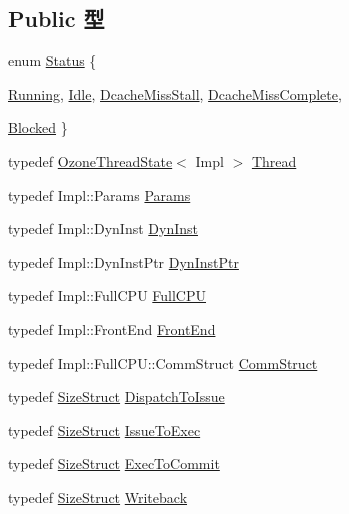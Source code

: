 \subsection*{Public 型}
\begin{DoxyCompactItemize}
\item 
enum \hyperlink{classBackEnd_a67a0db04d321a74b7e7fcfd3f1a3f70b}{Status} \{ \par
\hyperlink{classBackEnd_a67a0db04d321a74b7e7fcfd3f1a3f70ba2f5f2c4a8c4f4f0519d503dcdfbf55cb}{Running}, 
\hyperlink{classBackEnd_a67a0db04d321a74b7e7fcfd3f1a3f70bad3fa9ae9431d6cb1772f9d9df48cab19}{Idle}, 
\hyperlink{classBackEnd_a67a0db04d321a74b7e7fcfd3f1a3f70ba4ba5ae5815b190bd652669e2fdea5ed7}{DcacheMissStall}, 
\hyperlink{classBackEnd_a67a0db04d321a74b7e7fcfd3f1a3f70ba1eb81f4540c1c4b90839b08ae63c5d7f}{DcacheMissComplete}, 
\par
\hyperlink{classBackEnd_a67a0db04d321a74b7e7fcfd3f1a3f70ba9463ee9b8700258a1019b4b9d2d77a30}{Blocked}
 \}
\item 
typedef \hyperlink{structOzoneThreadState}{OzoneThreadState}$<$ Impl $>$ \hyperlink{classBackEnd_a9311aca87e8229ec3f7a7422ccbc9fbe}{Thread}
\item 
typedef Impl::Params \hyperlink{classBackEnd_a818e103eae798a24a06a0a34631849ea}{Params}
\item 
typedef Impl::DynInst \hyperlink{classBackEnd_ab741745c86a14c765b999c11167636d9}{DynInst}
\item 
typedef Impl::DynInstPtr \hyperlink{classBackEnd_a028ce10889c5f6450239d9e9a7347976}{DynInstPtr}
\item 
typedef Impl::FullCPU \hyperlink{classBackEnd_a90ba84e54618cc07f2e8f05e046cb5ce}{FullCPU}
\item 
typedef Impl::FrontEnd \hyperlink{classBackEnd_abe8e1d8243582d5024a1076f6091d9fe}{FrontEnd}
\item 
typedef Impl::FullCPU::CommStruct \hyperlink{classBackEnd_a82fb3c7183ba777a05c510ab2fbcfb82}{CommStruct}
\item 
typedef \hyperlink{structBackEnd_1_1SizeStruct}{SizeStruct} \hyperlink{classBackEnd_a99d236038ce57aa3ef78858228c5f972}{DispatchToIssue}
\item 
typedef \hyperlink{structBackEnd_1_1SizeStruct}{SizeStruct} \hyperlink{classBackEnd_a5badfe54e71b8fccb3d371013a8eef73}{IssueToExec}
\item 
typedef \hyperlink{structBackEnd_1_1SizeStruct}{SizeStruct} \hyperlink{classBackEnd_a91ea582041466725b4b17ce19f98685f}{ExecToCommit}
\item 
typedef \hyperlink{structBackEnd_1_1SizeStruct}{SizeStruct} \hyperlink{classBackEnd_a20d1fb15b536d49c687dee42d95c1a87}{Writeback}
\end{DoxyCompactItemize}
